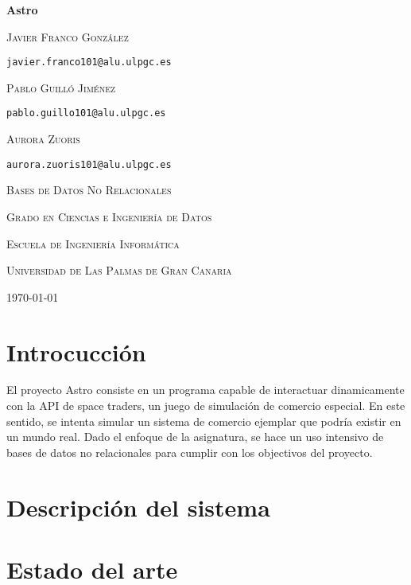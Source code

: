 \documentclass[spanish]{article}
\begin{document}
\begin{titlepage}
	\centering
	{\huge\bfseries Astro \par}
	\vspace{2cm}
	{\scshape\Large Javier Franco González \par\tt{javier.franco101@alu.ulpgc.es}\par}
	\vspace{1cm}
	{\scshape\Large Pablo Guilló Jiménez \par\tt{pablo.guillo101@alu.ulpgc.es}\par}
	\vspace{1cm}
	{\scshape\Large Aurora Zuoris \par\tt{aurora.zuoris101@alu.ulpgc.es}\par}
	\vspace{3cm}
	{\scshape\large Bases de Datos No Relacionales \par}
	\vspace{1cm}
	{\scshape\large Grado en Ciencias e Ingeniería de Datos\par}
	\vspace{1cm}
	{\scshape\large Escuela de Ingeniería Informática\par}
	\vspace{1cm}
	{\scshape\large Universidad de Las Palmas de Gran Canaria\par}
	\vspace{1cm}
	{\scshape\large \today{} \par}
\end{titlepage}

\tableofcontents

\section{Introcucción}

El proyecto Astro consiste en un programa capable de interactuar dinamicamente con la API de space traders,
un juego de simulación de comercio especial. En este sentido, se intenta simular un sistema de comercio
ejemplar que podría existir en un mundo real.
Dado el enfoque de la asignatura, se hace un uso intensivo de bases de datos no relacionales para
cumplir con los objectivos del proyecto.

\section{Descripción del sistema}

\section{Estado del arte}
\end{document}
